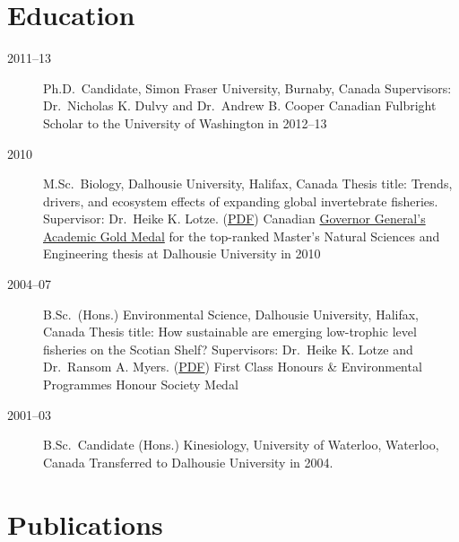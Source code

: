 \section{Education}

\begin{description}
\item[2011--13]
Ph.D.\ Candidate, Simon Fraser University, Burnaby, Canada Supervisors:
Dr.\ Nicholas K. Dulvy and Dr.\ Andrew B. Cooper Canadian Fulbright
Scholar to the University of Washington in 2012--13
\item[2010]
M.Sc.\ Biology, Dalhousie University, Halifax, Canada Thesis title:
Trends, drivers, and ecosystem effects of expanding global invertebrate
fisheries. Supervisor: Dr.\ Heike K. Lotze.
(\href{papers/Anderson_MSc_2010.pdf}{PDF}) Canadian
\href{http://goo.gl/nA1zE}{Governor General's Academic Gold Medal} for
the top-ranked Master's Natural Sciences and Engineering thesis at
Dalhousie University in 2010
\item[2004--07]
B.Sc.\ (Hons.) Environmental Science, Dalhousie University, Halifax,
Canada Thesis title: How sustainable are emerging low-trophic level
fisheries on the Scotian Shelf? Supervisors: Dr.\ Heike K. Lotze and
Dr.\ Ransom A. Myers. (\href{papers/Anderson_HSc_2006.pdf}{PDF}) First
Class Honours \& Environmental Programmes Honour Society Medal
\item[2001--03]
B.Sc.\ Candidate (Hons.) Kinesiology, University of Waterloo, Waterloo,
Canada Transferred to Dalhousie University in 2004.
\end{description}

\section{Publications}

